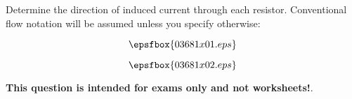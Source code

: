 

Determine the direction of induced current through each resistor.  Conventional flow notation will be assumed unless you specify otherwise:

$$\epsfbox{03681x01.eps}$$







$$\epsfbox{03681x02.eps}$$







{\bf This question is intended for exams only and not worksheets!}.



